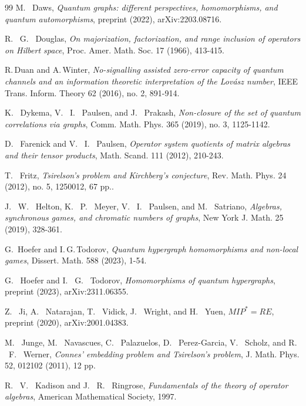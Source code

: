 \documentclass[11pt]{amsart}
\begin{document}
\begin{thebibliography}{99}
{\sc M. \, Daws},
{\it Quantum graphs: different perspectives, homomorphisms, and quantum automorphisms},
{\rm preprint (2022), arXiv:2203.08716}.

{\sc R. \, G. \, Douglas},
{\it On majorization, factorization, and range inclusion of operators on Hilbert space},
{\rm Proc. Amer. Math. Soc. 17 (1966), 413-415}.

{\sc R.\,Duan and A.\,Winter},
{\it No-signalling assisted zero-error capacity of quantum channels and an information theoretic interpretation of the 
Lov\'asz number},
{\rm IEEE Trans. Inform. Theory 62 (2016), no. 2, 891-914}.

{\sc K. \, Dykema, V. \, I. \, Paulsen, and J. \, Prakash},
{\it Non-closure of the set of quantum correlations via graphs},
{\rm Comm. Math. Phys. 365 (2019), no. 3, 1125-1142}.

{\sc D. \, Farenick and V. \, I. \, Paulsen},
{\it Operator system quotients of matrix algebras and their tensor products},
{\rm Math. Scand. 111 (2012), 210-243}.

{\sc T. \, Fritz},
{\it Tsirelson's problem and Kirchberg's conjecture},
{\rm Rev. Math. Phys. 24 (2012), no. 5, 1250012, 67 pp.}.

{\sc J. \, W. \, Helton, K. \, P. \, Meyer, V. \, I. \, Paulsen, and M. \, Satriano},
{\it Algebras, synchronous games, and chromatic numbers of graphs},
{\rm New York J. Math. 25 (2019), 328-361}.

{\sc G.\, Hoefer and I.\,G.\,Todorov},
{\it Quantum hypergraph homomorphisms and non-local games},
{\rm Dissert. Math. 588 (2023), 1-54}.

{\sc G. \, Hoefer and I. \, G. \, Todorov},
{\it Homomorphisms of quantum hypergraphs},
{\rm preprint (2023), arXiv:2311.06355}.

{\sc Z. \, Ji, A. \, Natarajan, T. \, Vidick, J. \, Wright, and H. \, Yuen},
{\it ${MIP}^{*}=RE$},
{\rm preprint (2020), arXiv:2001.04383}.

{\sc M. \, Junge, M. \, Navascues, C. \, Palazuelos, D. \, Perez-Garcia, V. \, Scholz, and R. \, F. \, Werner},
{\it Connes' embedding problem and Tsirelson's problem},
{\rm J. Math. Phys. 52, 012102 (2011), 12 pp.}

{\sc R. \, V. \, Kadison and J. \, R. \, Ringrose},
{\it Fundamentals of the theory of operator algebras},
{\rm American Mathematical Society, 1997}.


\end{thebibliography}
\end{document}
